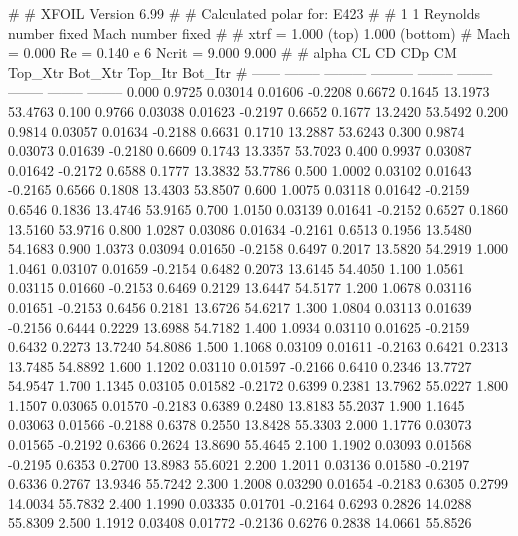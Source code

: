 #  
#       XFOIL         Version 6.99
#  
# Calculated polar for: E423                                            
#  
# 1 1 Reynolds number fixed          Mach number fixed         
#  
# xtrf =   1.000 (top)        1.000 (bottom)  
# Mach =   0.000     Re =     0.140 e 6     Ncrit =   9.000  9.000
#  
#   alpha    CL        CD       CDp       CM     Top_Xtr  Bot_Xtr  Top_Itr  Bot_Itr
#  ------ -------- --------- --------- -------- -------- -------- -------- --------
   0.000   0.9725   0.03014   0.01606  -0.2208   0.6672   0.1645  13.1973  53.4763
   0.100   0.9766   0.03038   0.01623  -0.2197   0.6652   0.1677  13.2420  53.5492
   0.200   0.9814   0.03057   0.01634  -0.2188   0.6631   0.1710  13.2887  53.6243
   0.300   0.9874   0.03073   0.01639  -0.2180   0.6609   0.1743  13.3357  53.7023
   0.400   0.9937   0.03087   0.01642  -0.2172   0.6588   0.1777  13.3832  53.7786
   0.500   1.0002   0.03102   0.01643  -0.2165   0.6566   0.1808  13.4303  53.8507
   0.600   1.0075   0.03118   0.01642  -0.2159   0.6546   0.1836  13.4746  53.9165
   0.700   1.0150   0.03139   0.01641  -0.2152   0.6527   0.1860  13.5160  53.9716
   0.800   1.0287   0.03086   0.01634  -0.2161   0.6513   0.1956  13.5480  54.1683
   0.900   1.0373   0.03094   0.01650  -0.2158   0.6497   0.2017  13.5820  54.2919
   1.000   1.0461   0.03107   0.01659  -0.2154   0.6482   0.2073  13.6145  54.4050
   1.100   1.0561   0.03115   0.01660  -0.2153   0.6469   0.2129  13.6447  54.5177
   1.200   1.0678   0.03116   0.01651  -0.2153   0.6456   0.2181  13.6726  54.6217
   1.300   1.0804   0.03113   0.01639  -0.2156   0.6444   0.2229  13.6988  54.7182
   1.400   1.0934   0.03110   0.01625  -0.2159   0.6432   0.2273  13.7240  54.8086
   1.500   1.1068   0.03109   0.01611  -0.2163   0.6421   0.2313  13.7485  54.8892
   1.600   1.1202   0.03110   0.01597  -0.2166   0.6410   0.2346  13.7727  54.9547
   1.700   1.1345   0.03105   0.01582  -0.2172   0.6399   0.2381  13.7962  55.0227
   1.800   1.1507   0.03065   0.01570  -0.2183   0.6389   0.2480  13.8183  55.2037
   1.900   1.1645   0.03063   0.01566  -0.2188   0.6378   0.2550  13.8428  55.3303
   2.000   1.1776   0.03073   0.01565  -0.2192   0.6366   0.2624  13.8690  55.4645
   2.100   1.1902   0.03093   0.01568  -0.2195   0.6353   0.2700  13.8983  55.6021
   2.200   1.2011   0.03136   0.01580  -0.2197   0.6336   0.2767  13.9346  55.7242
   2.300   1.2008   0.03290   0.01654  -0.2183   0.6305   0.2799  14.0034  55.7832
   2.400   1.1990   0.03335   0.01701  -0.2164   0.6293   0.2826  14.0288  55.8309
   2.500   1.1912   0.03408   0.01772  -0.2136   0.6276   0.2838  14.0661  55.8526
